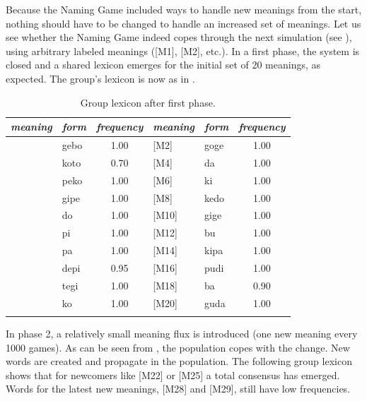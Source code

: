 Because the Naming Game included ways to 
handle new meanings from the start, nothing should 
have to be changed to handle an increased set of meanings. 
Let us see whether the Naming Game indeed copes
through the next simulation (see ), using 
arbitrary labeled meanings ([M1], [M2], etc.). 
In a first phase, the system is closed 
and a shared lexicon emerges for the initial set 
of 20 meanings, as expected. The group's lexicon
is now as in . 
\begin{table}
\begin{center}
\begin{tabular}{l  l  c  l  l  c } \midrule 
{\it meaning} & {\it form} & {\it frequency} & {\it meaning} & {\it form} & {\it frequency}\\ \midrule 
[M1]& gebo & 1.00 & [M2]& goge & 1.00 \\ \midrule 
[M3]& koto & 0.70 & [M4]& da & 1.00 \\ \midrule 
[M5]& peko & 1.00 & [M6]& ki & 1.00 \\ \midrule 
[M7]& gipe & 1.00 & [M8]& kedo & 1.00 \\ \midrule 
[M9]& do & 1.00 & [M10]& gige & 1.00 \\ \midrule 
[M11]& pi & 1.00 & [M12]& bu & 1.00 \\ \midrule 
[M13]& pa & 1.00 & [M14]& kipa & 1.00 \\ \midrule 
[M15]& depi & 0.95 & [M16]& pudi & 1.00 \\ \midrule 
[M17]& tegi & 1.00 & [M18]& ba & 0.90 \\ \midrule 
[M19]& ko & 1.00 & [M20]& guda & 1.00 \\ \midrule 
 \lspbottomrule
\end{tabular}
\caption{\label{tab:gphase1} Group lexicon after first phase.}
\end{center}
\end{table}
In phase 2, a relatively small meaning flux is introduced (one
new meaning every 1000 games). As can 
be seen from , 
the population copes with the change. New words are created and 
propagate in the population. The following group lexicon
shows that for newcomers like [M22] or [M25] a total 
consensus has emerged. Words for the latest
new meanings, [M28] and [M29], still have low frequencies. 
